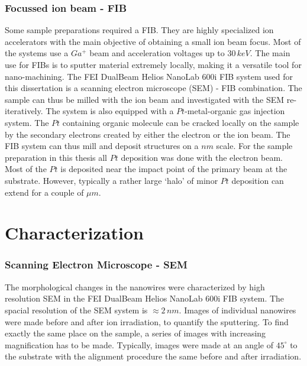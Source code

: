  

\subsubsection{Focussed ion beam - FIB}

Some sample preparations required a FIB. They are highly specialized ion accelerators with the main objective of obtaining a small ion beam focus. Most of the systems use a $Ga^+$ beam and acceleration voltages up to $30\,keV$. The main use for FIBs is to sputter material extremely locally, making it a versatile tool for nano-machining. The FEI DualBeam Helios NanoLab 600i FIB system used for this dissertation is a scanning electron microscope (SEM) - FIB combination. The sample can thus be milled with the ion beam and investigated with the SEM re-iteratively. The system is also equipped with a $Pt$-metal-organic gas injection system. The $Pt$ containing organic molecule can be cracked locally on the sample by the secondary electrons created by either the electron or the ion beam. The FIB system can thus mill and deposit structures on a $nm$ scale. For the sample preparation in this thesis all $Pt$ deposition was done with the electron beam. Most of the $Pt$ is deposited near the impact point of the primary beam at the substrate. However, typically a rather large `halo' of minor $Pt$ deposition can extend for a couple of $\mu m$. 

\section{Characterization}

\subsubsection{Scanning Electron Microscope - SEM}

The morphological changes in the nanowires were characterized by high resolution SEM in the FEI DualBeam Helios NanoLab 600i FIB system. The spacial resolution of the SEM system is $\approx 2\,nm$. Images of individual nanowires were made before and after ion irradiation, to quantify the sputtering. To find exactly the same place on the sample, a series of images with increasing magnification has to be made. Typically, images were made at an angle of $45^\circ$ to the substrate with the alignment procedure the same before and after irradiation.

